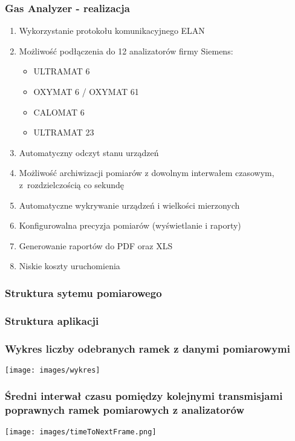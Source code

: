 \documentclass[ucs]{beamer}
\begin{document}

\begin{frame}
\frametitle{Gas Analyzer - realizacja}
\begin{enumerate}
\item Wykorzystanie protokołu komunikacyjnego ELAN
\item Możliwość podłączenia do 12 analizatorów firmy Siemens:
\begin{itemize}
\item ULTRAMAT 6
\item OXYMAT 6 / OXYMAT 61
\item CALOMAT 6
\item ULTRAMAT 23
\end{itemize}
\item Automatyczny odczyt stanu urządzeń
\item Możliwość archiwizacji pomiarów z dowolnym interwałem czasowym, z~rozdzielczością co sekundę
\item Automatyczne wykrywanie urządzeń i wielkości mierzonych
\item Konfigurowalna precyzja pomiarów (wyświetlanie i raporty)
\item Generowanie raportów do PDF oraz XLS
\item Niskie koszty uruchomienia
\end{enumerate}
\end{frame}

\begin{frame}
\frametitle{Struktura sytemu pomiarowego}

\end{frame}

\begin{frame}
\frametitle{Struktura aplikacji}
\begin{center}

\end{center}
\end{frame}

\begin{frame}
\frametitle{Wykres liczby odebranych ramek z danymi pomiarowymi}
\texttt{[image: images/wykres]}
\end{frame}

\begin{frame}
\frametitle{Średni interwał czasu pomiędzy kolejnymi transmisjami poprawnych ramek pomiarowych z analizatorów}
\begin{center}
\texttt{[image: images/timeToNextFrame.png]}
\end{center}
\end{frame}
\end{document}
